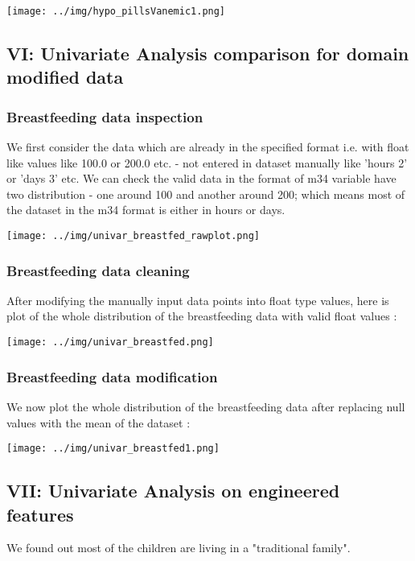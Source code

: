 \texttt{[image: ../img/hypo\_pillsVanemic1.png]}

\newpage


\subsection{VI: Univariate Analysis comparison for domain modified data}

\subsubsection{Breastfeeding data inspection}

We first consider the data which are already in the specified format i.e. with float like values like 100.0 or 200.0 etc. -  not entered in dataset manually like 'hours 2' or 'days 3' etc. We can check the valid data in the format of m34 variable have two distribution - one around 100 and another around 200; which means most of the dataset in the m34 format is either in hours or days.

\texttt{[image: ../img/univar\_breastfed\_rawplot.png]}


\subsubsection{Breastfeeding data cleaning}
After modifying the manually input data points into float type values, here is plot of the whole distribution of the breastfeeding data with valid float values :

\texttt{[image: ../img/univar\_breastfed.png]}


\subsubsection{Breastfeeding data modification}

We now plot the whole distribution of the breastfeeding data after replacing null values with the mean of the dataset :

\texttt{[image: ../img/univar\_breastfed1.png]}

\newpage


\subsection{VII: Univariate Analysis on engineered features}

We found out most of the children are living in a "traditional family".

